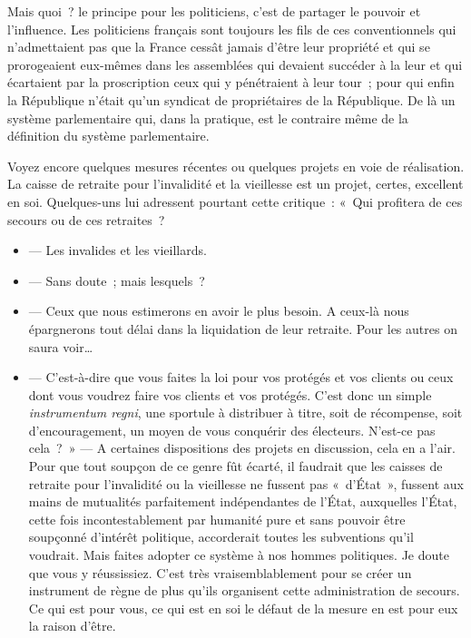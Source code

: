 \documentclass[french,twoside]{book} %
\begin{document}
Mais quoi ? le principe pour les politiciens, c’est de partager le pouvoir et l’influence. Les politiciens français sont toujours les fils de ces conventionnels qui n’admettaient pas que la France cessât jamais d’être leur propriété et qui se prorogeaient eux-mêmes dans les assemblées qui devaient succéder à la leur et qui écartaient par la proscription ceux  qui y pénétraient à leur tour ; pour qui enfin la République n’était qu’un syndicat de propriétaires de la République. De là un système parlementaire qui, dans la pratique, est le contraire même de la définition du système parlementaire.\par
Voyez encore quelques mesures récentes ou quelques projets en voie de réalisation. La caisse de retraite pour l’invalidité et la vieillesse est un projet, certes, excellent en soi. Quelques-uns lui adressent pourtant cette critique : « Qui profitera de ces secours ou de ces retraites ?\par

\begin{itemize}[itemsep=0pt,]
\item  — Les invalides et les vieillards.
\item  — Sans doute ; mais lesquels ?
\item  — Ceux que nous estimerons en avoir le plus besoin. A ceux-là nous épargnerons tout délai dans la liquidation de leur retraite. Pour les autres on saura voir…
\item  — C’est-à-dire que vous faites la loi pour vos protégés et vos clients ou ceux dont vous voudrez faire vos clients et vos protégés. C’est donc un simple {\itshape instrumentum regni}, une sportule à distribuer à titre, soit de récompense, soit d’encouragement, un moyen de vous conquérir des électeurs. N’est-ce pas cela ? » — A certaines dispositions des projets en discussion, cela en a l’air. Pour que tout soupçon de ce genre fût écarté, il faudrait que les caisses de retraite pour l’invalidité ou  la vieillesse ne fussent pas « d’État », fussent aux mains de mutualités parfaitement indépendantes de l’État, auxquelles l’État, cette fois incontestablement par humanité pure et sans pouvoir être soupçonné d’intérêt politique, accorderait toutes les subventions qu’il voudrait. Mais faites adopter ce système à nos hommes politiques. Je doute que vous y réussissiez. C’est très vraisemblablement pour se créer un instrument de règne de plus qu’ils organisent cette administration de secours. Ce qui est pour vous, ce qui est en soi le défaut de la mesure en est pour eux la raison d’être.
\end{itemize}
\end{document}
